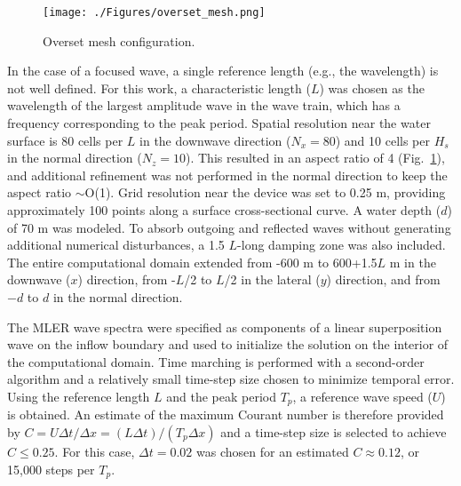 \begin{figure}[!t]
\begin{center}
\texttt{[image: ./Figures/overset\_mesh.png]}
\end{center}
\caption{Overset mesh configuration.}
\label{fig:mesh}
\end{figure}

In the case of a focused wave, a single reference length (e.g., the wavelength) is not well defined. For this work, a characteristic length ($L$) was chosen as the wavelength of the largest amplitude wave in the wave train, which has a frequency corresponding to the peak period. 
Spatial resolution near the water surface is 80 cells per $L$ in the downwave direction ($N_x=80$) and 10 cells per $H_s$ in the normal direction ($N_z=10$). This resulted in an aspect ratio of 4 (Fig.~\ref{fig:mesh}), and additional refinement was not performed in the normal direction to keep the aspect ratio $\sim$O(1). Grid resolution near the device was set to 0.25 m, providing approximately 100 points along a surface cross-sectional curve. A water depth ($d$) of 70 m was modeled. To absorb outgoing and reflected waves without generating additional numerical disturbances, a 1.5 $L$-long damping zone was also included. The entire computational domain extended from -600 m to 600+1.5$L$ m in the downwave ($x$) direction, from -$L$/2 to $L$/2 in the lateral ($y$) direction, and from $-d$ to $d$ in the normal direction. 

The MLER wave spectra were specified as components of a linear superposition wave on the inflow boundary and used to initialize the solution on the interior of the computational domain. Time marching is performed with a second-order algorithm and a relatively small time-step size chosen to minimize temporal error. Using the reference length $L$ and the peak period $T_p$, a reference wave speed ($U$) is obtained. An estimate of the maximum Courant number is therefore provided by $C = U \Delta t/\Delta x = (L\Delta t)/(T_p \Delta x)$ and a time-step size is selected to achieve $C \le 0.25$. For this case, $\Delta t=0.02$ was chosen for an estimated $C \approx 0.12$, or 15,000 steps per $T_p$.